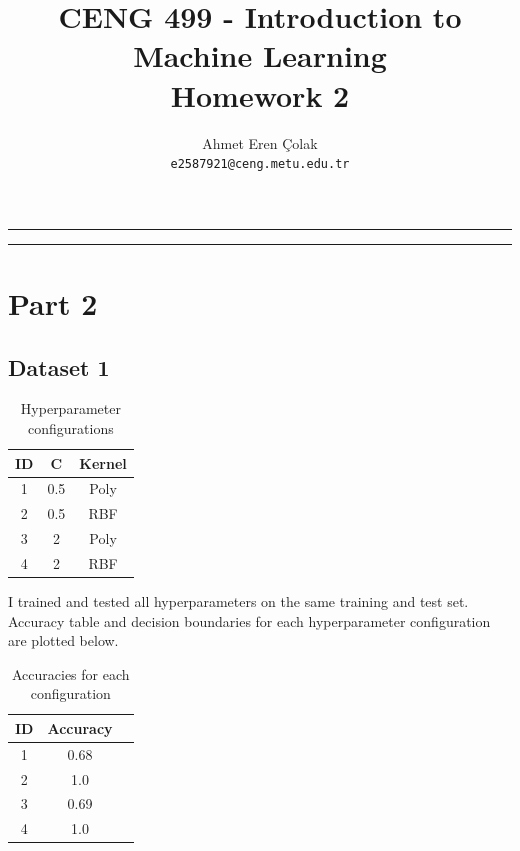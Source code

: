 \documentclass[12pt,a4paper, margin=1in]{article}
\author{
    Ahmet Eren Çolak\\
    \texttt{e2587921@ceng.metu.edu.tr}
}
\title{ 
    \textbf{CENG 499 - Introduction to Machine Learning} \\ Homework 2
}
\begin{document}
\maketitle

\noindent\rule{19cm}{1.2pt}

\tableofcontents

\bigskip
\noindent\rule{19cm}{1.2pt}


\section{Part 2}

\subsection{Dataset 1}

\begin{table}[H]
    \centering
    \begin{tabular}{|c|c|c|}
    \hline
    \textbf{ID} & \textbf{C} & \textbf{Kernel} \\ \hline
    1           & 0.5        & Poly           \\ \hline
    2           & 0.5        & RBF   \\ \hline
    3           & 2          & Poly         \\ \hline
    4           & 2          & RBF   \\ \hline
    \end{tabular}
    \caption{Hyperparameter configurations}
\end{table}

I trained and tested all hyperparameters on the same training and test set. Accuracy table and decision boundaries for each hyperparameter
configuration are plotted below.

\begin{table}[H]
    \centering
    \begin{tabular}{|c|c|c|}
    \hline
    \textbf{ID} & \textbf{Accuracy} \\ \hline
    1           & 0.68              \\ \hline
    2           & 1.0               \\ \hline
    3           & 0.69              \\ \hline
    4           & 1.0               \\ \hline
    \end{tabular}
    \caption{Accuracies for each configuration}
\end{table}
\end{document}
